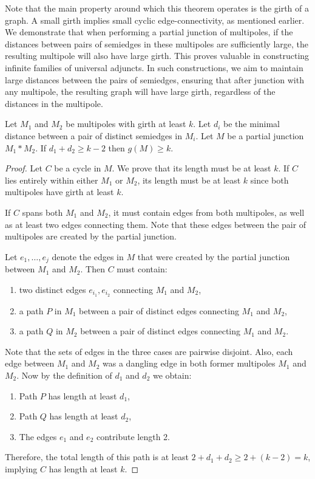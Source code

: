 \documentclass[12pt, twoside]{book}
\begin{document}
Note that the main property around which this theorem operates is the girth of a graph. A small girth implies small cyclic edge-connectivity, as mentioned earlier. We demonstrate that when performing a partial junction of multipoles, if the distances between pairs of semiedges in these multipoles are sufficiently large, the resulting multipole will also have large girth. This proves valuable in constructing infinite families of universal adjuncts. In such constructions, we aim to maintain large distances between the pairs of semiedges, ensuring that after junction with any multipole, the resulting graph will have large girth, regardless of the distances in the multipole.

\begin{lemma}\label{lem:cyclic-multipoles-with-girth-and-distance}
	Let $M_1$ and $M_2$ be multipoles with girth at least $k$. Let $d_i$ be the minimal distance between a pair of distinct semiedges in $M_i$. Let $M$ be a partial junction $M_1*M_2$. If $d_1+d_2\geq k-2$ then $g(M)\geq k$.
\end{lemma}

\begin{proof}
	Let $C$ be a cycle in $M$. We prove that its length must be at least $k$. If $C$ lies entirely within either $M_1$ or $M_2$, its length must be at least $k$ since both multipoles have girth at least $k$.
	
	If $C$ spans both $M_1$ and $M_2$, it must contain edges from both multipoles, as well as at least two edges connecting them. Note that these edges between the pair of multipoles are created by the partial junction.
	
	Let $e_1,\dots,e_j$ denote the edges in $M$ that were created by the partial junction between $M_1$ and $M_2$. Then $C$ must contain:
	\begin{enumerate}[label=(\roman*)]
		\item two distinct edges $e_{i_1},e_{i_2}$ connecting $M_1$ and $M_2$,
		\item a path $P$ in $M_1$ between a pair of distinct edges connecting $M_1$ and $M_2$,
		\item a path $Q$ in $M_2$ between a pair of distinct edges connecting $M_1$ and $M_2$.
	\end{enumerate}
	Note that the sets of edges in the three cases are pairwise disjoint. Also, each edge between $M_1$ and $M_2$ was a dangling edge in both former multipoles $M_1$ and $M_2$. Now by the definition of $d_1$ and $d_2$ we obtain:
	
	\begin{enumerate}[label=(\roman*)]
		\item Path $P$ has length at least $d_1$,
		\item Path $Q$ has length at least $d_2$,
		\item The edges $e_1$ and $e_2$ contribute length 2.
	\end{enumerate}
	
	Therefore, the total length of this path is at least $2+d_1+d_2 \geq 2+(k-2) = k$, implying $C$ has length at least $k$.
\end{proof}
\end{document}
